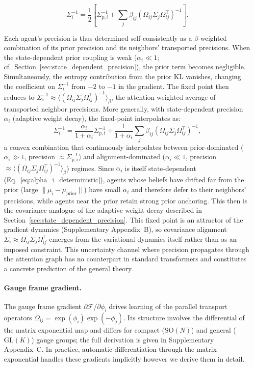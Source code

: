\documentclass[twoside,11pt]{article}
\begin{document}
\begin{equation}
\Sigma_i^{-1}
=\frac{1}{2}
\left[
\Sigma_{p,i}^{-1}
+ \sum_j \beta_{ij}
(\Omega_{ij}\Sigma_j\Omega_{ij}^\top)^{-1}
\right].
\label{eq:sigma_fixed_point_main}
\end{equation}

Each agent's precision is thus determined self-consistently as a
$\beta$-weighted combination of its prior precision and its neighbors'
transported precisions. When the state-dependent prior coupling is
weak ($\alpha_i \ll 1$; cf.\ Section~\ref{sec:state_dependent_precision}),
the prior term becomes negligible. Simultaneously, the entropy
contribution from the prior KL vanishes, changing the coefficient on
$\Sigma_i^{-1}$ from $-2$ to $-1$ in the gradient. The fixed point then
reduces to
$\Sigma_i^{-1} \approx
\langle(\Omega_{ij}\Sigma_j\Omega_{ij}^\top)^{-1}\rangle_\beta$,
the attention-weighted average of transported neighbor precisions.
More generally, with state-dependent precision $\alpha_i$ (adaptive
weight decay), the fixed-point interpolates as:
%
\begin{equation}
\Sigma_i^{-1}
= \frac{\alpha_i}{1+\alpha_i} \Sigma_{p,i}^{-1}
+ \frac{1}{1+\alpha_i}\sum_j \beta_{ij} 
(\Omega_{ij}\Sigma_j\Omega_{ij}^\top)^{-1},
\label{eq:sigma_fixed_point_alpha}
\end{equation}
%
a convex combination that continuously interpolates between
prior-dominated ($\alpha_i \gg 1$, precision $\approx \Sigma_{p,i}^{-1}$)
and alignment-dominated ($\alpha_i \ll 1$, precision
$\approx \langle(\Omega_{ij}\Sigma_j\Omega_{ij}^\top)^{-1}\rangle_\beta$)
regimes. Since $\alpha_i$ is itself state-dependent
(Eq.~\ref{eq:alpha_i_deterministic}), agents whose beliefs have
drifted far from the prior (large $\|\mu_i - \mu_{\text{prior}}\|$)
have small $\alpha_i$ and therefore defer to their neighbors'
precisions, while agents near the prior retain strong prior anchoring. This then is the covariance analogue of the adaptive weight decay described in
Section~\ref{sec:state_dependent_precision}.
This fixed point is an attractor of the gradient dynamics
(Supplementary Appendix~B), so covariance alignment
$\Sigma_i \approx \Omega_{ij}\Sigma_j\Omega_{ij}^\top$ emerges from the
variational dynamics itself rather than as an imposed constraint. This
uncertainty channel where precision propagates through the attention
graph has no counterpart in standard transformers and constitutes a
concrete prediction of the general theory.

\paragraph{Gauge frame gradient.}
The gauge frame gradient $\partial \mathcal{F}/\partial \phi_i$ drives learning of the parallel transport operators $\Omega_{ij} = \exp(\phi_i)\exp(-\phi_j)$. Its structure involves the differential of the matrix exponential map and differs for compact ($\mathrm{SO}(N)$) and general ($\mathrm{GL}(K)$) gauge groups; the full derivation is given in Supplementary Appendix~C. In practice, automatic differentiation through the matrix exponential handles these gradients implicitly however we derive them in detail.
\end{document}
